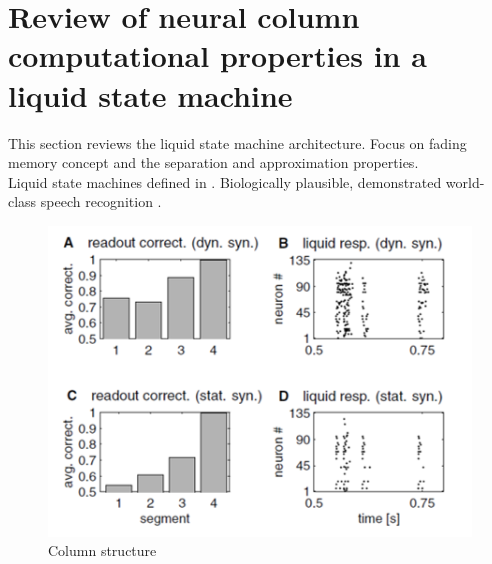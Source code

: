 \documentclass[a4paper,11pt]{article}
\numberwithin{equation}{section}
\begin{document}
\section{Review of neural column computational properties in a liquid state machine}
This section reviews the liquid state machine architecture.
Focus on fading memory concept and the separation and approximation properties.\\
Liquid state machines defined in \cite{maas2002}.
Biologically plausible, demonstrated world-class speech recognition \cite{zhang2015}.
\begin{figure}
 \caption{Column structure}
 \centering
   \includegraphics[width=\textwidth]{fig/maas_memory}
\end{figure}\\
\\ \\
\end{document}
